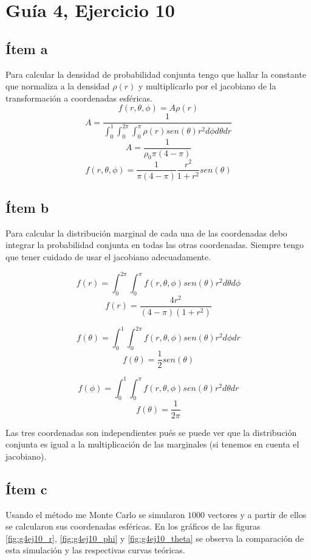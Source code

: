\documentclass{article}
\begin{document}
\section{Guía 4, Ejercicio 10}

\subsection{Ítem a}
Para calcular la densidad de probabilidad conjunta tengo que hallar la constante que normaliza a la densidad $\rho(r)$ y multiplicarlo por el jacobiano de la transformación a coordenadas esféricas.
$$f(r, \theta, \phi) = A \rho(r) $$
$$A = \frac{1}{\int_0^1 \int_0^{2\pi} \int_0^{\pi}\rho(r) sen(\theta) r^2 d\phi d\theta dr} $$
$$A = \frac{1}{\rho_0 \pi (4 - \pi)} $$
$$f(r, \theta, \phi) = \frac{1}{\pi (4 - \pi)} \frac{r^2}{1 + r^2} sen(\theta)$$

\subsection{Ítem b}
Para calcular la distribución marginal de cada una de las coordenadas debo integrar la probabilidad conjunta en todas las otras coordenadas. Siempre tengo que tener cuidado de usar el jacobiano adecuadamente.

$$f(r) = \int_0^{2\pi}\int_0^{\pi} f(r, \theta, \phi) sen(\theta) r^2 d\theta d\phi$$
$$f(r) = \frac{4 r^2}{(4 - \pi) (1 + r^2)}$$

$$f(\theta) = \int_0^1 \int_0^{2\pi}  f(r, \theta, \phi) sen(\theta) r^2 d\phi dr$$
$$f(\theta) = \frac{1}{2} sen(\theta)$$

$$f(\phi) = \int_0^1 \int_0^{\pi}  f(r, \theta, \phi) sen(\theta) r^2 d\theta dr$$
$$f(\theta) = \frac{1}{2\pi}$$

Las tres coordenadas son independientes pués se puede ver que la distribución conjunta es igual a la multiplicación de las marginales (si tenemos en cuenta el jacobiano).

\subsection{Ítem c}

Usando el método me Monte Carlo se simularon $1000$ vectores y a partir de ellos se calcularon sus coordenadas esféricas.
En los gráficos de las figuras \ref{fig:g4ej10_r}, \ref{fig:g4ej10_phi} y \ref{fig:g4ej10_theta} se observa la comparación de esta simulación y las respectivas curvas teóricas. 
\end{document}
